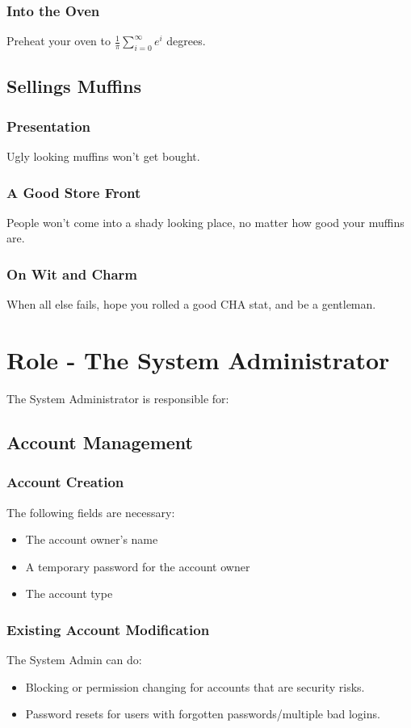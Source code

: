 \documentclass{article}
\begin{document}
\subsubsection{Into the Oven}
Preheat your oven to $\frac{1}{\pi}\sum_{i=0}^{\infty}e^i$ degrees.
\subsection{Sellings Muffins}
\subsubsection{Presentation}
Ugly looking muffins won't get bought.
\subsubsection{A Good Store Front}
People won't come into a shady looking place, no matter how good your muffins are.
\subsubsection{On Wit and Charm}
When all else fails, hope you rolled a good CHA stat, and be a gentleman.

\section{Role - The System Administrator}
The System Administrator is responsible for:
\subsection{Account Management}
\subsubsection{Account Creation}
The following fields are necessary:
\begin{itemize}
  \item The account owner's name
  \item A temporary password for the account owner
  \item The account type
\end{itemize}
\subsubsection{Existing Account Modification}
The System Admin can do:
\begin{itemize}
  \item Blocking or permission changing for accounts that are security risks.
  \item Password resets for users with forgotten passwords/multiple bad logins.
\end{itemize}
\end{document}
